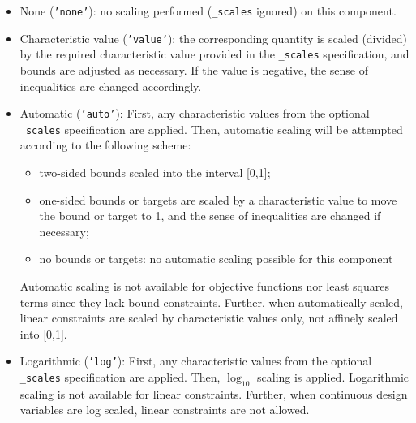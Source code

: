 \begin{itemize}

\item None ({\tt 'none'}): no scaling performed ({\tt *\_scales}
ignored) on this component.

\item Characteristic value ({\tt 'value'}): the corresponding quantity
      is scaled (divided) by the required characteristic value
      provided in the {\tt *\_scales} specification, and bounds are
      adjusted as necessary. If the value is negative, the sense of
      inequalities are changed accordingly.

\item Automatic ({\tt 'auto'}): First, any characteristic values from
      the optional {\tt *\_scales} specification are applied. Then,
      automatic scaling will be attempted according to the following
      scheme:

  \begin{itemize}
  
  \item two-sided bounds scaled into the interval [0,1];
	
  \item one-sided bounds or targets are scaled by a characteristic
    value to move the bound or target to 1, and the sense of
    inequalities are changed if necessary;

  \item no bounds or targets: no automatic scaling possible for this component
    
  \end{itemize}

  Automatic scaling is not available for objective functions nor least
  squares terms since they lack bound constraints. Further, when
  automatically scaled, linear constraints are scaled by
  characteristic values only, not affinely scaled into [0,1].

\item Logarithmic ({\tt 'log'}): First, any characteristic values from
the optional {\tt *\_scales} specification are applied. Then,
$\log_{10}$ scaling is applied. Logarithmic scaling is not available
for linear constraints. Further, when continuous design variables are
log scaled, linear constraints are not allowed.

\end{itemize}

